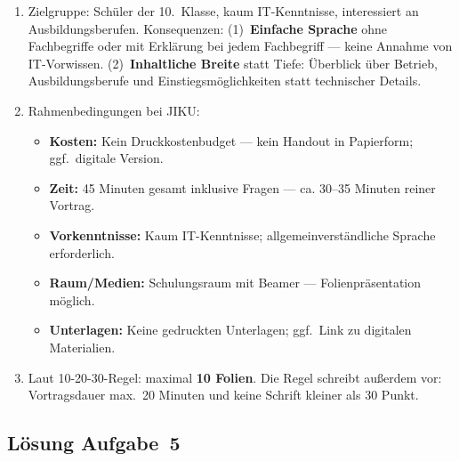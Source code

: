 \documentclass[11pt, a4paper]{article}
\begin{document}
\begin{enumerate}[label=(\alph*)]
  \item Zielgruppe: Schüler der 10.~Klasse, kaum IT-Kenntnisse, interessiert an Ausbildungsberufen. Konsequenzen: (1)~\textbf{Einfache Sprache} ohne Fachbegriffe oder mit Erklärung bei jedem Fachbegriff --- keine Annahme von IT-Vorwissen. (2)~\textbf{Inhaltliche Breite} statt Tiefe: Überblick über Betrieb, Ausbildungsberufe und Einstiegsmöglichkeiten statt technischer Details.

  \item Rahmenbedingungen bei JIKU:
  \begin{itemize}
    \item \textbf{Kosten:} Kein Druckkostenbudget --- kein Handout in Papierform; ggf.\ digitale Version.
    \item \textbf{Zeit:} 45 Minuten gesamt inklusive Fragen --- ca. 30--35 Minuten reiner Vortrag.
    \item \textbf{Vorkenntnisse:} Kaum IT-Kenntnisse; allgemeinverständliche Sprache erforderlich.
    \item \textbf{Raum/Medien:} Schulungsraum mit Beamer --- Folienpräsentation möglich.
    \item \textbf{Unterlagen:} Keine gedruckten Unterlagen; ggf.\ Link zu digitalen Materialien.
  \end{itemize}

  \item Laut 10-20-30-Regel: maximal \textbf{10 Folien}. Die Regel schreibt außerdem vor: Vortragsdauer max.\ 20 Minuten und keine Schrift kleiner als 30 Punkt.
\end{enumerate}

\subsection*{Lösung Aufgabe~5}
\end{document}
